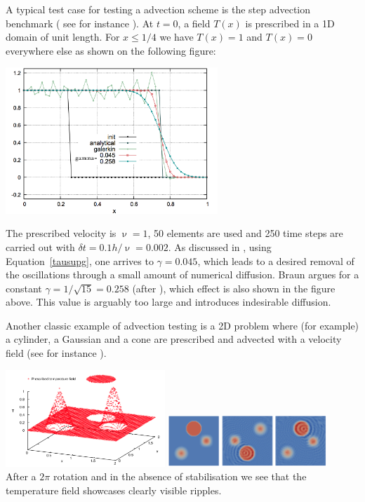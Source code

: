 A typical test case for testing a advection scheme is the step advection benchmark (
see for instance \cite{dohu03}). At $t=0$, 
a field $T(x)$ is prescribed in a 1D domain of unit length. For $x\le 1/4$ we have $T(x)=1$ and 
$T(x)=0$ everywhere else as shown on the following figure:
\begin{center}
\includegraphics[width=8cm]{images/supg/fantom3}
\end{center}
The prescribed velocity is $\upnu=1$, 50 elements are used and 250 time steps are 
carried out with $\delta t=0.1h/\upnu=0.002$.
As discussed in \cite{thie11}, using Equation~\ref{tausupg}, 
one arrives to $\gamma=0.045$, which leads to a desired removal of the oscillations through a small
amount of numerical diffusion. Braun \cite{brau03} argues for a constant
$\gamma=1/\sqrt{15}=0.258$ (after \cite{hubr82}), which effect is also shown in the figure above. This 
value is arguably too large and introduces indesirable diffusion.








Another classic example of advection testing is a 2D problem where (for example) a cylinder, a Gaussian 
and a cone are prescribed and advected with a velocity field (see for instance \cite{dohu03}). 

\begin{center}
\includegraphics[width=0.45\textwidth]{images/supg/supg1}
\includegraphics[width=0.45\textwidth]{images/supg/supg2}\\
{\small After a $2\pi$ rotation and in the absence of stabilisation we see that the temperature field
showcases clearly visible ripples.}
\end{center}






